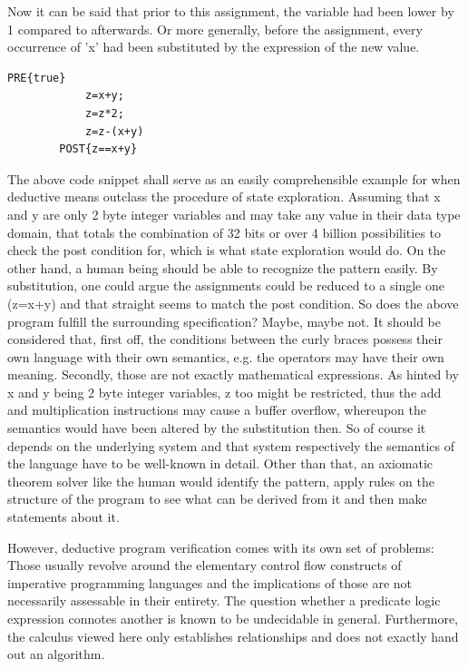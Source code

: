 Now it can be said that prior to this assignment, the variable had been lower by 1 compared to afterwards. Or more generally, before the assignment, every occurrence of 'x' had been substituted by the expression of the new value.

\begin{center}
	\begin{lstlisting}[caption={Disadvantages of state-space exploration}]
		PRE{true}
			z=x+y;
			z=z*2;
			z=z-(x+y)
		POST{z==x+y}
	\end{lstlisting}
\end{center}

The above code snippet shall serve as an easily comprehensible example for when deductive means outclass the procedure of state exploration. Assuming that x and y are only 2 byte integer variables and may take any value in their data type domain, that totals the combination of 32 bits or over 4 billion possibilities to check the post condition for, which is what state exploration would do. On the other hand, a human being should be able to recognize the pattern easily. By substitution, one could argue the assignments could be reduced to a single one (z=x+y) and that straight seems to match the post condition. So does the above program fulfill the surrounding specification? Maybe, maybe not. It should be considered that, first off, the conditions between the curly braces possess their own language with their own semantics, e.g. the operators may have their own meaning. Secondly, those are not exactly mathematical expressions. As hinted by x and y being 2 byte integer variables, z too might be restricted, thus the add and multiplication instructions may cause a buffer overflow, whereupon the semantics would have been altered by the substitution then. So of course it depends on the underlying system and that system respectively the semantics of the language have to be well-known in detail. Other than that, an axiomatic theorem solver like the human would identify the pattern, apply rules on the structure of the program to see what can be derived from it and then make statements about it.

However, deductive program verification comes with its own set of problems: Those usually revolve around the elementary control flow constructs of imperative programming languages and the implications of those are not necessarily assessable in their entirety. The question whether a predicate logic expression connotes another is known to be undecidable in general. Furthermore, the calculus viewed here only establishes relationships and does not exactly hand out an algorithm.

